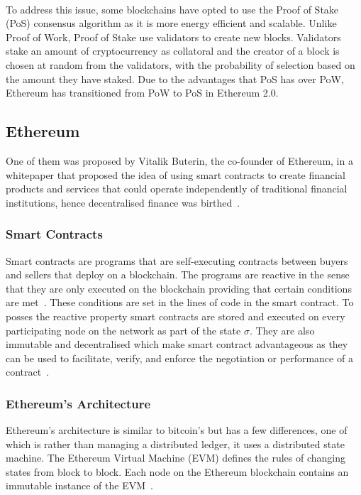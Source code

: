 \\[5mm]
To address this issue, some blockchains have opted to use the Proof of Stake (PoS) consensus algorithm as it is more energy efficient and scalable. Unlike Proof of Work, Proof of Stake use validators to create new blocks. Validators stake an amount of cryptocurrency as collatoral and the creator of a block is chosen at random from the validators, with the probability of selection based on the amount they have staked. Due to the advantages that PoS has over PoW, Ethereum has transitioned from PoW to PoS in Ethereum 2.0.

\subsection{Ethereum}
One of them was proposed by Vitalik Buterin, the co-founder of Ethereum, in a whitepaper that proposed the idea of using smart contracts to create financial products and services that could operate independently of traditional financial institutions, hence decentralised finance was birthed~\cite{buterin2014next}.

\subsubsection{Smart Contracts}
Smart contracts are programs that are self-executing contracts between buyers and sellers that deploy on a blockchain. The programs are reactive in the sense that they are only executed on the blockchain providing that certain conditions are met~\cite{noauthor_what_nodate}. These conditions are set in the lines of code in the smart contract. To posses the reactive property smart contracts are stored and executed on every participating node on the network as part of the state $\sigma$. They are also immutable and decentralised which make smart contract advantageous as they can be used to facilitate, verify, and enforce the negotiation or performance of a contract~\cite{noauthor_introduction_nodate, noauthor_smart_nodate}.

\subsubsection{Ethereum's Architecture}
Ethereum's architecture is similar to bitcoin's but has a few differences, one of which is rather than managing a distributed ledger, it uses a distributed state machine. The Ethereum Virtual Machine (EVM) defines the rules of changing states from block to block. Each node on the Ethereum blockchain contains an immutable instance of the EVM~\cite{noauthor_ethereum_nodate}.

